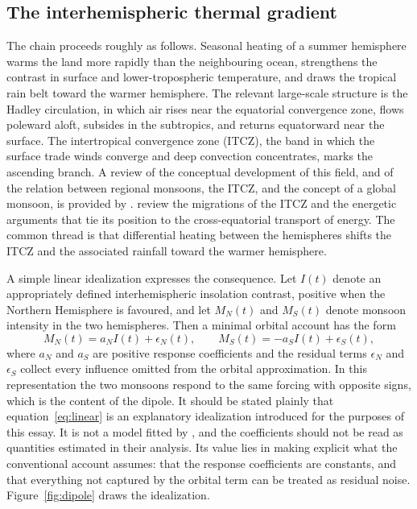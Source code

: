 \documentclass[11pt]{article}
\theoremstyle{definition}
\begin{document}
\subsection{The interhemispheric thermal gradient}

The chain proceeds roughly as follows. Seasonal heating of a summer hemisphere warms the land more rapidly than the neighbouring ocean, strengthens the contrast in surface and lower-tropospheric temperature, and draws the tropical rain belt toward the warmer hemisphere. The relevant large-scale structure is the Hadley circulation, in which air rises near the equatorial convergence zone, flows poleward aloft, subsides in the subtropics, and returns equatorward near the surface. The intertropical convergence zone (ITCZ), the band in which the surface trade winds converge and deep convection concentrates, marks the ascending branch. A review of the conceptual development of this field, and of the relation between regional monsoons, the ITCZ, and the concept of a global monsoon, is provided by \citet{geen2020}. \citet{schneider2014} review the migrations of the ITCZ and the energetic arguments that tie its position to the cross-equatorial transport of energy. The common thread is that differential heating between the hemispheres shifts the ITCZ and the associated rainfall toward the warmer hemisphere.

A simple linear idealization expresses the consequence. Let $I(t)$ denote an appropriately defined interhemispheric insolation contrast, positive when the Northern Hemisphere is favoured, and let $M_N(t)$ and $M_S(t)$ denote monsoon intensity in the two hemispheres. Then a minimal orbital account has the form
\begin{equation}
M_N(t) = a_N I(t) + \epsilon_N(t), \qquad M_S(t) = -a_S I(t) + \epsilon_S(t),
\label{eq:linear}
\end{equation}
where $a_N$ and $a_S$ are positive response coefficients and the residual terms $\epsilon_N$ and $\epsilon_S$ collect every influence omitted from the orbital approximation. In this representation the two monsoons respond to the same forcing with opposite signs, which is the content of the dipole. It should be stated plainly that equation~\eqref{eq:linear} is an explanatory idealization introduced for the purposes of this essay. It is not a model fitted by \citeauthor{olson2026}, and the coefficients should not be read as quantities estimated in their analysis. Its value lies in making explicit what the conventional account assumes: that the response coefficients are constants, and that everything not captured by the orbital term can be treated as residual noise. Figure~\ref{fig:dipole} draws the idealization.
\end{document}
